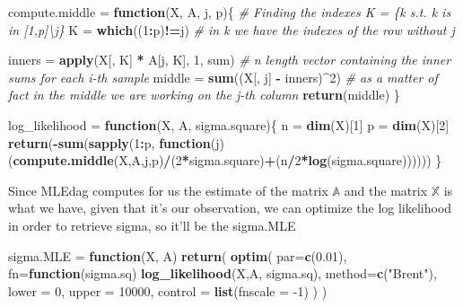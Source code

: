 \documentclass[
]{article}
\newenvironment{Shaded}{\begin{snugshade}}{\end{snugshade}}
\newcommand{\CommentTok}[1]{\textcolor[rgb]{0.56,0.35,0.01}{\textit{#1}}}
\newcommand{\ControlFlowTok}[1]{\textcolor[rgb]{0.13,0.29,0.53}{\textbf{#1}}}
\newcommand{\DataTypeTok}[1]{\textcolor[rgb]{0.13,0.29,0.53}{#1}}
\newcommand{\DecValTok}[1]{\textcolor[rgb]{0.00,0.00,0.81}{#1}}
\newcommand{\FloatTok}[1]{\textcolor[rgb]{0.00,0.00,0.81}{#1}}
\newcommand{\KeywordTok}[1]{\textcolor[rgb]{0.13,0.29,0.53}{\textbf{#1}}}
\newcommand{\NormalTok}[1]{#1}
\newcommand{\OperatorTok}[1]{\textcolor[rgb]{0.81,0.36,0.00}{\textbf{#1}}}
\newcommand{\StringTok}[1]{\textcolor[rgb]{0.31,0.60,0.02}{#1}}
\begin{document}
\begin{Shaded}
\begin{Highlighting}[]
\NormalTok{compute.middle =}\StringTok{ }\ControlFlowTok{function}\NormalTok{(X, A, j, p)\{}
  \CommentTok{# Finding the indexes K = \{k s.t. k is in [1,p]\textbackslash{}j\}}
\NormalTok{    K =}\StringTok{ }\KeywordTok{which}\NormalTok{((}\DecValTok{1}\OperatorTok{:}\NormalTok{p)}\OperatorTok{!=}\NormalTok{j)}
    \CommentTok{# in k we have the indexes of the row without j}
    
\NormalTok{    inners =}\StringTok{ }\KeywordTok{apply}\NormalTok{(X[, K] }\OperatorTok{*}\StringTok{ }\NormalTok{A[j, K], }\DecValTok{1}\NormalTok{, sum) }\CommentTok{# n length vector containing the inner sums for each i-th sample}
\NormalTok{    middle =}\StringTok{ }\KeywordTok{sum}\NormalTok{((X[, j] }\OperatorTok{-}\StringTok{ }\NormalTok{inners)}\OperatorTok{^}\DecValTok{2}\NormalTok{)  }\CommentTok{# as a matter of fact in the middle we are working on the j-th column}
    \KeywordTok{return}\NormalTok{(middle)}
\NormalTok{\}}

\NormalTok{log_likelihood =}\StringTok{ }\ControlFlowTok{function}\NormalTok{(X, A, sigma.square)\{}
\NormalTok{  n =}\StringTok{ }\KeywordTok{dim}\NormalTok{(X)[}\DecValTok{1}\NormalTok{]}
\NormalTok{  p =}\StringTok{ }\KeywordTok{dim}\NormalTok{(X)[}\DecValTok{2}\NormalTok{]}
  \KeywordTok{return}\NormalTok{(}\OperatorTok{-}\KeywordTok{sum}\NormalTok{(}\KeywordTok{sapply}\NormalTok{(}\DecValTok{1}\OperatorTok{:}\NormalTok{p, }\ControlFlowTok{function}\NormalTok{(j) (}\KeywordTok{compute.middle}\NormalTok{(X,A,j,p)}\OperatorTok{/}\NormalTok{(}\DecValTok{2}\OperatorTok{*}\NormalTok{sigma.square)}\OperatorTok{+}\NormalTok{(n}\OperatorTok{/}\DecValTok{2}\OperatorTok{*}\KeywordTok{log}\NormalTok{(sigma.square))))))}
\NormalTok{\}}
\end{Highlighting}
\end{Shaded}

Since MLEdag computes for us the estimate of the matrix \(\mathbb{A}\)
and the matrix \(\mathbb{X}\) is what we have, given that it's our
observation, we can optimize the log likelihood in order to retrieve
sigma, so it'll be the sigma.MLE

\begin{Shaded}
\begin{Highlighting}[]
\NormalTok{sigma.MLE =}\StringTok{ }\ControlFlowTok{function}\NormalTok{(X, A)}
  \KeywordTok{return}\NormalTok{(}
    \KeywordTok{optim}\NormalTok{(}
      \DataTypeTok{par=}\KeywordTok{c}\NormalTok{(}\FloatTok{0.01}\NormalTok{),}
      \DataTypeTok{fn=}\ControlFlowTok{function}\NormalTok{(sigma.sq)}
        \KeywordTok{log_likelihood}\NormalTok{(X,A, sigma.sq),}
      \DataTypeTok{method=}\KeywordTok{c}\NormalTok{(}\StringTok{"Brent"}\NormalTok{),}
      \DataTypeTok{lower =} \DecValTok{0}\NormalTok{,}
      \DataTypeTok{upper =} \DecValTok{10000}\NormalTok{,}
            \DataTypeTok{control =} \KeywordTok{list}\NormalTok{(}\DataTypeTok{fnscale =} \DecValTok{-1}\NormalTok{)}
\NormalTok{    )}
\NormalTok{  )}
\end{Highlighting}
\end{Shaded}
\end{document}
